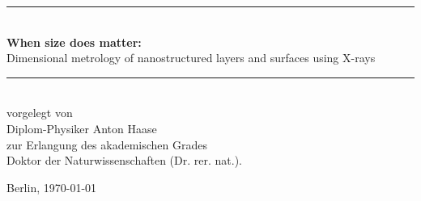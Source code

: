 
\begin{titlepage}
\begin{center}

    \vspace*{0.2\paperheight}

    \rule{\linewidth}{0.5mm} \\[0.4cm]
    {\huge\bfseries\sffamily When size does matter:} \\[1ex]
    {\LARGE\sffamily Dimensional metrology of nanostructured layers and surfaces using X-rays} \\
    \rule{\linewidth}{0.5mm} \\[4cm]


    {\sffamily%
    vorgelegt von \\Diplom-Physiker Anton Haase \\zur Erlangung des akademischen Grades \\Doktor der Naturwissenschaften (Dr. rer. nat.).}

    \vfill
    {%
    \sffamily%
    \begin{otherlanguage}{ngerman}
        Berlin, \today
    \end{otherlanguage}
    }
\end{center}
\end{titlepage}


